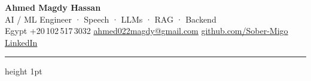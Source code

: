 
\begin{center}
  {\LARGE\bfseries\color{Primary}Ahmed Magdy Hassan}\\[0.25em]
  {\large\color{Secondary}AI / ML Engineer · Speech · LLMs · RAG · Backend}\\[0.35em]
  {\small\color{Muted}%
    Egypt%
    \contactsep%
    +20\,102\,517\,3032%
    \contactsep%
    \href{mailto:ahmed022magdy@gmail.com}{ahmed022magdy@gmail.com}%
    \contactsep%
    \href{https://github.com/Sober-Migo}{github.com/Sober-Migo}%
    \contactsep%
    \href{https://www.linkedin.com/in/ahmed-magdy-50808a250}{LinkedIn}%
  }
\end{center}
\vspace{0.15em}
{\color{Rule}\hrule height 1pt}
\vspace{0.1em}
